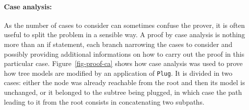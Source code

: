 \documentclass{llncs}
\begin{document}
\paragraph{Case analysis:}
As the number of cases to consider can sometimes confuse the prover, it is often useful to split the
problem in a sensible way. A proof by case analysis is nothing more than an if statement, each branch
narrowing the cases to consider and possibly providing additional informations on how to carry out
the proof in this particular case. Figure~\ref{fig-proof-ca} shows how case analysis was used to
prove how tree models are modified by an application of \texttt{Plug}. It is divided in two cases: either
the node was already reachable from the root and then its model is unchanged, or it belonged to
the subtree being plugged, in which case the path leading to it from the root consists in concatenating
two subpaths.
\end{document}
